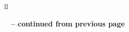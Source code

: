\documentclass[letterpaper,10pt,english]{sphinxmanual}
\begin{document}
\begin{longtable}{ll}
\hline
\endfirsthead

%
{{\bfseries \tablename\ \thetable{} -- continued from previous page}} \\
\hline
\endhead

\hline {} \\ \hline
\endfoot

\hline
\endlastfoot

\end{longtable}




\renewcommand{\indexname}{Index}
\printindex
\end{document}
